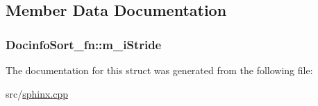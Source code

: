\subsection{Member Data Documentation}
\hypertarget{structDocinfoSort__fn_a8fb802504c8674670dd9c238797c349c}{
\subsubsection[{m\-\_\-i\-Stride}]{ Docinfo\-Sort\-\_\-fn\-::m\-\_\-i\-Stride}}\label{structDocinfoSort__fn_a8fb802504c8674670dd9c238797c349c}


The documentation for this struct was generated from the following file\-:\begin{DoxyCompactItemize}
\item 
src/\hyperlink{sphinx_8cpp}{sphinx.\-cpp}\end{DoxyCompactItemize}
